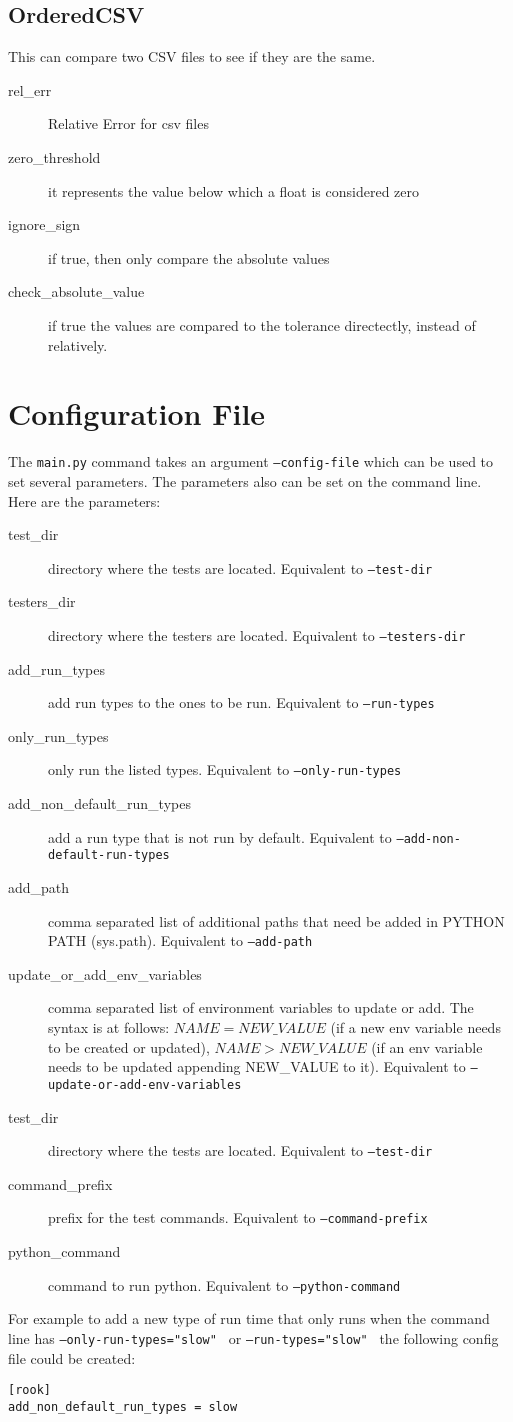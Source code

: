 \documentclass{article}
\begin{document}
\subsection{OrderedCSV}

This can compare two CSV files to see if they are the same.

\begin{description}
  \item[rel\_err] Relative Error for csv files
  \item[zero\_threshold] it represents the value below which a float is considered zero
  \item[ignore\_sign] if true, then only compare the absolute values
  \item[check\_absolute\_value] if true the values are compared to the tolerance directectly, instead of relatively.
\end{description}

\section{Configuration File}

The {\tt main.py} command takes an argument {\tt --config-file} which can be used to set several parameters.  The parameters also can be set on the command line.  Here are the parameters:

\begin{description}
\item[test\_dir] directory where the tests are located.  Equivalent to {\tt --test-dir}
\item[testers\_dir] directory where the testers are located. Equivalent to {\tt --testers-dir}
\item[add\_run\_types] add run types to the ones to be run. Equivalent to {\tt --run-types}
\item[only\_run\_types] only run the listed types. Equivalent to {\tt --only-run-types}
\item[add\_non\_default\_run\_types] add a run type that is not run by default. Equivalent to {\tt --add-non-default-run-types}
\item[add\_path] comma separated list of additional paths that need be added in PYTHON PATH (sys.path).  Equivalent to {\tt --add-path}
\item[update\_or\_add\_env\_variables] comma separated list of environment variables to update or add. 
The syntax is at follows: $NAME=NEW\_VALUE$ (if a new env variable needs to be created or updated), 
$NAME>NEW\_VALUE$ (if an env variable needs to be updated appending NEW\_VALUE to it).  Equivalent to {\tt --update-or-add-env-variables}
\item[test\_dir] directory where the tests are located.  Equivalent to {\tt --test-dir}
\item[command\_prefix] prefix for the test commands.  Equivalent to {\tt --command-prefix}
\item[python\_command] command to run python. Equivalent to {\tt --python-command}
\end{description}

For example to add a new type of run time that only runs when the command line has {\tt --only-run-types="slow" } or {\tt --run-types="slow" } the following config file could be created:

\begin{verbatim}
[rook]
add_non_default_run_types = slow
\end{verbatim}
\end{document}

